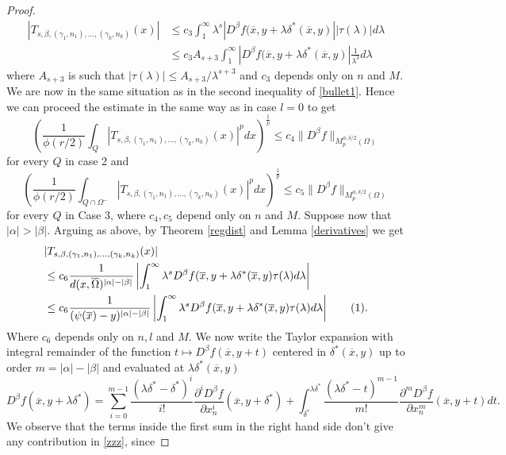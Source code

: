 \documentclass[12pt]{article}
\theoremstyle{definition}
\newcommand\addtag{\refstepcounter{equation}\tag{\theequation}}
\begin{document}
\begin{proof}
\begin{align*}
 |T_{s,\beta,(\gamma_1,n_1),...,(\gamma_k,n_k)}(x) | &\le c_3 \int_1^\infty\lambda^s |D^\beta f(\overline x, y+\lambda \delta^*(\overline x, y)| |\tau(\lambda)|d\lambda \\
&\le c_3A_{s+3} \int_1^\infty|D^\beta f(\overline x, y+\lambda \delta^*(\overline x, y)| \frac{1}{\lambda^3}d\lambda
\end{align*}
where  $A_{s+3}$ is such that $|\tau(\lambda)|\le A_{s+3}/\lambda^{s+3}$ and  $c_3$ depends only  on $n$ and $M.$ We are now in the same situation as in the second inequality of \eqref{bullet1}. Hence we can proceed the estimate in the same way as in case $l=0$ to get 
\[\left( \frac{1}{\phi(r/2)}\int_Q  \left| T_{s,\beta,(\gamma_1,n_1),...,(\gamma_k,n_k)}(x)\right|^p dx\right )^{\frac{1}{p}} \le c_4 \| D^\beta f \|_{M_p^{\phi,\delta/2}(\Omega)} \] 
for every $Q$ in case 2 and
\[\left( \frac{1}{\phi(r/2)}\int_{Q \cap \Omega^-}  \left| T_{s,\beta,(\gamma_1,n_1),...,(\gamma_k,n_k)}(x)\right|^p dx\right )^{\frac{1}{p}} \le c_5 \| D^\beta f \|_{M_p^{\phi,\delta/2}(\Omega)} \] 
 for every $Q$ in Case 3, where $c_4,c_5$ depend only on $n$ and $M.$
Suppose now that $|\alpha|>|\beta|.$ Arguing as above, by Theorem \ref{regdist} and Lemma \ref{derivatives} we get
\begin{align*}
&|T_{s,\beta,(\gamma_1,n_1),...,(\gamma_k,n_k)}(x) | \\
&\le c_6 \frac{1}{d(x,\overline \Omega)^{|\alpha|-|\beta|}} \left|\int_1^\infty \lambda^sD^\beta f(\overline x, y+\lambda \delta^*(\overline x, y)\tau(\lambda)d\lambda \right| \\
& \le  c_6 \frac{1}{(\psi(\overline x)-y)^{|\alpha|-|\beta|}} \left |\int_1^\infty \lambda^s D^\beta f(\overline x, y+\lambda \delta^*(\overline x, y) \tau(\lambda)d\lambda \right |\addtag \label{zzz} .   
\end{align*}
Where $c_6$ depends only on $n,l$ and $M$. We now write the Taylor expansion with integral remainder of the function $t \mapsto D^\beta f(\overline x, y+t)$ centered in $\delta^*(\overline x,y)$ up to order $m=|\alpha|-|\beta|$ and evaluated at $\lambda \delta^*(\overline x,y)$
\[
D^\beta f(\overline x, y+\lambda \delta^*) =\sum_{i=0}^{m-1} \frac{(\lambda \delta^*-\delta^*)^i}{i!}\frac{\partial^i D^\beta f}{\partial x_n^i}(\overline x,y+\delta^*) +\int_{\delta^*}^{\lambda \delta^*} \frac{(\lambda \delta^*-t)^{m-1}}{m!}\frac{\partial^{m} D^\beta f}{\partial x_n^{m} }(\overline x,y+t)dt. 
\]
We observe that the terms inside the first sum in the right hand side don't give any contribution in \eqref{zzz}, since

\end{proof}
\end{document}
